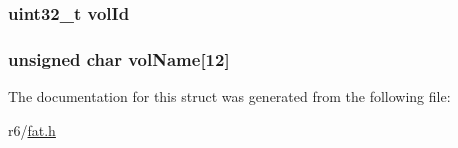 \subsubsection[{\texorpdfstring{vol\+Id}{volId}}]{\setlength{\rightskip}{0pt plus 5cm}uint32\+\_\+t vol\+Id}\hypertarget{structboot__sector_a86483b972623ebdcf816ef6fc098c1c6}{}\label{structboot__sector_a86483b972623ebdcf816ef6fc098c1c6}
\subsubsection[{\texorpdfstring{vol\+Name}{volName}}]{\setlength{\rightskip}{0pt plus 5cm}unsigned char vol\+Name\mbox{[}12\mbox{]}}\hypertarget{structboot__sector_abf99e855e09d7505a608b31f619535a6}{}\label{structboot__sector_abf99e855e09d7505a608b31f619535a6}


The documentation for this struct was generated from the following file\+:\begin{DoxyCompactItemize}
\item 
r6/\hyperlink{fat_8h}{fat.\+h}\end{DoxyCompactItemize}
